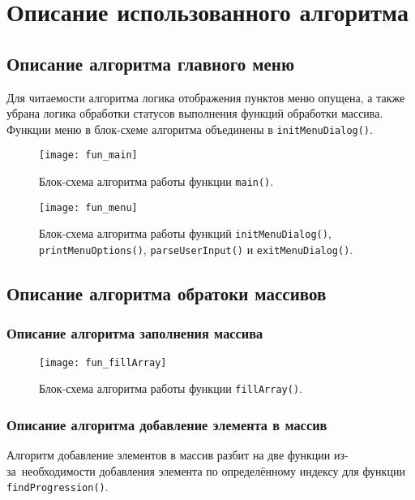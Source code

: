 \section{Описание использованного алгоритма}

\subsection{Описание алгоритма главного меню}
Для читаемости алгоритма логика отображения пунктов меню опущена,
а также убрана логика обработки статусов выполнения функций обработки массива.
Функции меню в блок-схеме алгоритма объединены в \texttt{initMenuDialog()}.

\begin{figure}[H]
  \centering
  \texttt{[image: fun\_main]}
  \caption{
    Блок-схема алгоритма работы функции 
    \texttt{main()}.
  }
\end{figure}

\begin{figure}[H]
  \centering
  \texttt{[image: fun\_menu]}
  \caption{
    Блок-схема алгоритма работы функций 
    \texttt{initMenuDialog()},
    \texttt{printMenuOptions()}, 
    \texttt{parseUserInput()} 
    и \texttt{exitMenuDialog()}.
  }
\end{figure}

\subsection{Описание алгоритма обратоки массивов}

\subsubsection{Описание алгоритма заполнения массива}

\begin{figure}[H]
  \centering
  \texttt{[image: fun\_fillArray]}
  \caption{
    Блок-схема алгоритма работы функции 
    \texttt{fillArray()}.
  }
\end{figure}

\subsubsection{Описание алгоритма добавление элемента в массив}

Алгоритм добавление элементов в массив разбит на две функции
из-за необходимости добавления элемента по определённому
индексу для функции \texttt{findProgression()}.

